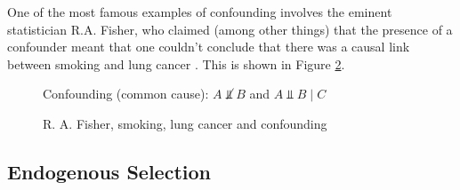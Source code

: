 \documentclass[11pt, oneside]{article}   	%
\begin{document}
\bigskip
\noindent
One of the most famous examples of confounding involves the eminent statistician R.A. Fisher, who claimed (among other things) that the presence of a 
confounder meant that one couldn't conclude that there was a causal link between smoking and lung cancer \cite{FISHER1958}. This is shown in 
Figure \ref{fig:fisher}.

\begin{figure}
\caption{Confounding (common cause): $A \not \Vbar B$ and $A \Vbar B \mid C$}
\label{fig:confounding}
\end{figure}

 
 
\begin{figure}[b]
\caption{R. A. Fisher, smoking, lung cancer and confounding}
\label{fig:fisher}
\end{figure}

\subsection{Endogenous Selection}
\end{document}
